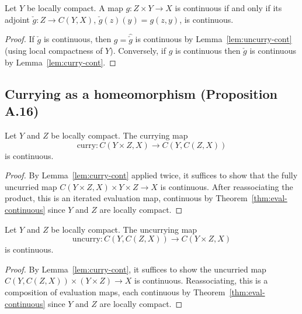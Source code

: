 \begin{proposition}
    \label{prop:exponential-law}
    \leanok
    Let $Y$ be locally compact. A map $g : Z \times Y \to X$ is continuous if
    and only if its adjoint $\check{g} : Z \to C(Y, X)$,
    $\check{g}(z)(y) = g(z, y)$, is continuous.
\end{proposition}
\begin{proof}
    If $\check{g}$ is continuous, then $g = \widehat{\check{g}}$ is continuous
    by Lemma~\ref{lem:uncurry-cont} (using local compactness of $Y$).
    Conversely, if $g$ is continuous then $\check{g}$ is continuous by
    Lemma~\ref{lem:curry-cont}.
\end{proof}

\subsection{Currying as a homeomorphism (Proposition A.16)}

\begin{lemma}
    \label{lem:continuous-curry}
    \leanok
    Let $Y$ and $Z$ be locally compact. The currying map
    \[
        \mathrm{curry} : C(Y \times Z, X) \to C(Y, C(Z, X))
    \]
    is continuous.
\end{lemma}
\begin{proof}
    By Lemma~\ref{lem:curry-cont} applied twice, it suffices to show that the
    fully uncurried map $C(Y \times Z, X) \times Y \times Z \to X$ is
    continuous. After reassociating the product, this is an iterated evaluation
    map, continuous by Theorem~\ref{thm:eval-continuous} since $Y$ and $Z$ are
    locally compact.
\end{proof}

\begin{lemma}
    \label{lem:continuous-uncurry}
    \leanok
    Let $Y$ and $Z$ be locally compact. The uncurrying map
    \[
        \mathrm{uncurry} : C(Y, C(Z, X)) \to C(Y \times Z, X)
    \]
    is continuous.
\end{lemma}
\begin{proof}
    By Lemma~\ref{lem:curry-cont}, it suffices to show the uncurried map
    $C(Y, C(Z, X)) \times (Y \times Z) \to X$ is continuous. Reassociating, this
    is a composition of evaluation maps, each continuous by
    Theorem~\ref{thm:eval-continuous} since $Y$ and $Z$ are locally compact.
\end{proof}

